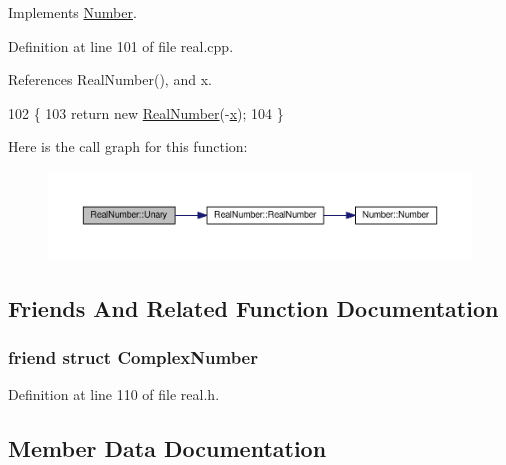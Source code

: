 Implements \hyperlink{structNumber_a4283e401f772614fc566db78087cf860}{Number}.



Definition at line 101 of file real.\+cpp.



References Real\+Number(), and x.


\begin{DoxyCode}
102 \{
103     \textcolor{keywordflow}{return} \textcolor{keyword}{new} \hyperlink{structRealNumber_aa61264f519c95ec9b63ab94c352bcc67}{RealNumber}(-\hyperlink{structRealNumber_ac33d80bee75448490199a0aa48ccce1e}{x});
104 \}
\end{DoxyCode}


Here is the call graph for this function\+:
\nopagebreak
\begin{figure}[H]
\begin{center}
\leavevmode
\includegraphics[width=350pt]{d2/d49/structRealNumber_a0370c55b92e3ec36270a894918ae53ca_cgraph}
\end{center}
\end{figure}




\subsection{Friends And Related Function Documentation}
\subsubsection[{\texorpdfstring{Complex\+Number}{ComplexNumber}}]{\setlength{\rightskip}{0pt plus 5cm}friend struct {\bf Complex\+Number}\hspace{0.3cm}{\ttfamily [friend]}}\hypertarget{structRealNumber_ae59451cc698db2f80a85244883578673}{}\label{structRealNumber_ae59451cc698db2f80a85244883578673}


Definition at line 110 of file real.\+h.



\subsection{Member Data Documentation}
